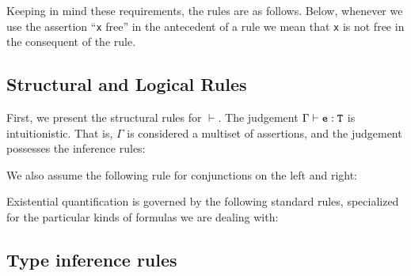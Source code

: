 Keeping in mind these requirements, the rules are as follows. Below,
whenever we use the assertion ``{\tt x} free'' in the antecedent of
a rule we mean
that {\tt x} is not free in the consequent of the rule.


\subsection{
      Structural and Logical Rules
}


First, we present the structural rules for $\vdash$. The judgement
$\Gamma\vdash {\tt e}: {\tt T}$ is
intuitionistic. That is, $\Gamma$ is considered a multiset of assertions, and
the judgement possesses the inference rules:






We also assume the following rule for conjunctions on the left and right:






Existential quantification is governed by the following standard rules,
specialized for the particular kinds of formulas we are dealing with:











\subsection{
      Type inference rules
}


